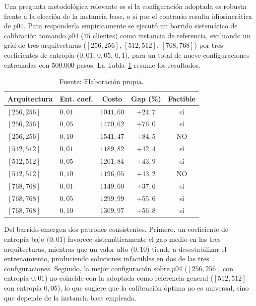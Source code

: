 Una pregunta metodológica relevante es si la configuración adoptada es robusta frente a la elección de la instancia base, o si por el contrario resulta idiosincrática de $p01$. Para responderla empíricamente se ejecutó un barrido sistemático de calibración tomando $p04$ ($75$ clientes) como instancia de referencia, evaluando un grid de tres arquitecturas ($[256,256]$, $[512,512]$, $[768,768]$) por tres coeficientes de entropía ($0{,}01$, $0{,}05$, $0{,}1$), para un total de nueve configuraciones entrenadas con $500.000$ pasos. La Tabla~\ref{tab:barrido-p04} resume los resultados.

\begin{table}[H]
    \centering
    \renewcommand{\arraystretch}{1.15}
    \setlength{\tabcolsep}{7pt}
    \begin{tabular}{@{}llccc@{}}
        \toprule
        \textbf{Arquitectura} & \textbf{Ent. coef.} & \textbf{Costo} & \textbf{Gap (\%)} & \textbf{Factible} \\
        \midrule
        $[256,256]$ & $0{,}01$ & $1041{,}60$ & $+24{,}7$ & sí \\
        $[256,256]$ & $0{,}05$ & $1470{,}62$ & $+76{,}0$ & sí \\
        $[256,256]$ & $0{,}10$ & $1541{,}47$ & $+84{,}5$ & NO \\
        $[512,512]$ & $0{,}01$ & $1189{,}82$ & $+42{,}4$ & sí \\
        $[512,512]$ & $0{,}05$ & $1201{,}84$ & $+43{,}9$ & sí \\
        $[512,512]$ & $0{,}10$ & $1196{,}05$ & $+43{,}2$ & NO \\
        $[768,768]$ & $0{,}01$ & $1149{,}60$ & $+37{,}6$ & sí \\
        $[768,768]$ & $0{,}05$ & $1299{,}99$ & $+55{,}6$ & sí \\
        $[768,768]$ & $0{,}10$ & $1309{,}97$ & $+56{,}8$ & sí \\
        \bottomrule
    \end{tabular}
    \caption{\label{tab:barrido-p04} Barrido de calibración sobre la instancia $p04$ (semilla 0, $75$ clientes, $500.000$ pasos).}
    \caption*{Fuente: Elaboración propia.}
\end{table}

Del barrido emergen dos patrones consistentes. Primero, un coeficiente de entropía bajo ($0{,}01$) favorece sistemáticamente el gap medio en las tres arquitecturas, mientras que un valor alto ($0{,}10$) tiende a desestabilizar el entrenamiento, produciendo soluciones infactibles en dos de las tres configuraciones. Segundo, la mejor configuración sobre $p04$ ($[256,256]$ con entropía $0{,}01$) no coincide con la adoptada como referencia general ($[512,512]$ con entropía $0{,}05$), lo que sugiere que la calibración óptima no es universal, sino que depende de la instancia base empleada.

